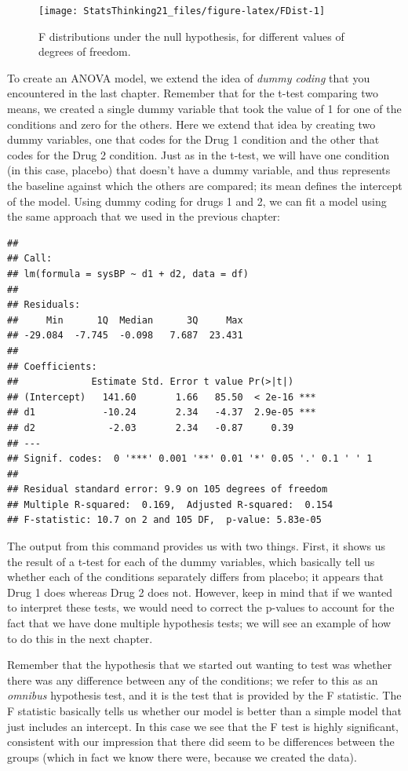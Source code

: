 \documentclass[12pt,]{book}
\theoremstyle{definition}
\theoremstyle{definition}
\theoremstyle{definition}
\theoremstyle{remark}
\begin{document}
\begin{figure}
\texttt{[image: StatsThinking21\_files/figure-latex/FDist-1]} \caption{F distributions under the null hypothesis, for different values of degrees of freedom.}\label{fig:FDist}
\end{figure}

To create an ANOVA model, we extend the idea of \emph{dummy coding} that you encountered in the last chapter. Remember that for the t-test comparing two means, we created a single dummy variable that took the value of 1 for one of the conditions and zero for the others. Here we extend that idea by creating two dummy variables, one that codes for the Drug 1 condition and the other that codes for the Drug 2 condition. Just as in the t-test, we will have one condition (in this case, placebo) that doesn't have a dummy variable, and thus represents the baseline against which the others are compared; its mean defines the intercept of the model. Using dummy coding for drugs 1 and 2, we can fit a model using the same approach that we used in the previous chapter:

\begin{verbatim}
## 
## Call:
## lm(formula = sysBP ~ d1 + d2, data = df)
## 
## Residuals:
##     Min      1Q  Median      3Q     Max 
## -29.084  -7.745  -0.098   7.687  23.431 
## 
## Coefficients:
##             Estimate Std. Error t value Pr(>|t|)    
## (Intercept)   141.60       1.66   85.50  < 2e-16 ***
## d1            -10.24       2.34   -4.37  2.9e-05 ***
## d2             -2.03       2.34   -0.87     0.39    
## ---
## Signif. codes:  0 '***' 0.001 '**' 0.01 '*' 0.05 '.' 0.1 ' ' 1
## 
## Residual standard error: 9.9 on 105 degrees of freedom
## Multiple R-squared:  0.169,  Adjusted R-squared:  0.154 
## F-statistic: 10.7 on 2 and 105 DF,  p-value: 5.83e-05
\end{verbatim}

The output from this command provides us with two things. First, it shows us the result of a t-test for each of the dummy variables, which basically tell us whether each of the conditions separately differs from placebo; it appears that Drug 1 does whereas Drug 2 does not. However, keep in mind that if we wanted to interpret these tests, we would need to correct the p-values to account for the fact that we have done multiple hypothesis tests; we will see an example of how to do this in the next chapter.

Remember that the hypothesis that we started out wanting to test was whether there was any difference between any of the conditions; we refer to this as an \emph{omnibus} hypothesis test, and it is the test that is provided by the F statistic. The F statistic basically tells us whether our model is better than a simple model that just includes an intercept. In this case we see that the F test is highly significant, consistent with our impression that there did seem to be differences between the groups (which in fact we know there were, because we created the data).
\end{document}
